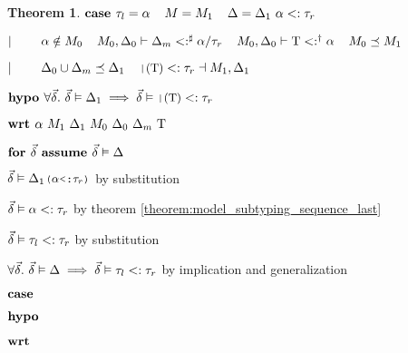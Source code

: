 \documentclass[acmsmall]{acmart}
\theoremstyle{definition}
\newtheorem{theorem}{Theorem}[section]
\begin{document}
\begin{theorem}
    \item \Z $\textbf{case } 
      \tau_l = \alpha
      \hspace{4mm}
      M = M_1
      \hspace{4mm}
      \Delta = \Delta_1\ \alpha <: \tau_r
    $
    \item \Z $|\ \ \ \ \ \ \ 
      \alpha \notin M_0
      \hspace{4mm}
      M_0, \Delta_0 \vdash \Delta_m <:^\sharp \alpha \slash \tau_r
      \hspace{4mm}
      M_0, \Delta_0 \vdash \mathrm{T} <:^\dagger \alpha
      \hspace{4mm}
      M_0 \preceq M_1
    $
    \item \Z $\contin
      \Delta_0 \cup \Delta_m \preceq \Delta_1
      \I
      \J{|$(\Tau)$} <: \tau_r \given M_1, \Delta_1
    $
    \item \Z $\B{hypo } \forall \vec{\delta} .\ \vec{\delta} \satisfies \Delta_1 \implies
      \vec{\delta} \satisfies \J{|$(\Tau)$} <: \tau_r
    $
    \item \Z $\B{wrt } \alpha\ M_1\ \Delta_1\ M_0\ \Delta_0\ \Delta_m\ \Tau$
      \item \Z\Z $\textbf{for } \vec{\delta} \textbf{ assume } \vec{\delta} \vDash \Delta$
        \item \Z\Z\Z $\vec{\delta} \satisfies \Delta_1 \J{($\alpha$<:$\tau_r$)}$ by substitution
        \item \Z\Z\Z $\vec{\delta} \vDash \alpha <: \tau_r$ by theorem \ref{theorem:model_subtyping_sequence_last} 
        \item \Z\Z\Z $\vec{\delta} \vDash \tau_l <: \tau_r$ by substitution 
      \item \Z\Z $\forall \vec{\delta} .\ \vec{\delta} \vDash \Delta \implies \vec{\delta} \vDash \tau_l <: \tau_r$ 
      by implication and generalization 
      \item \Z\Z {} 

    \item \Z $\textbf{case } $
    \item \Z $\textbf{hypo } $
    \item \Z $\textbf{wrt } $
      \item \Z\Z {} 


\end{theorem}
\end{document}
